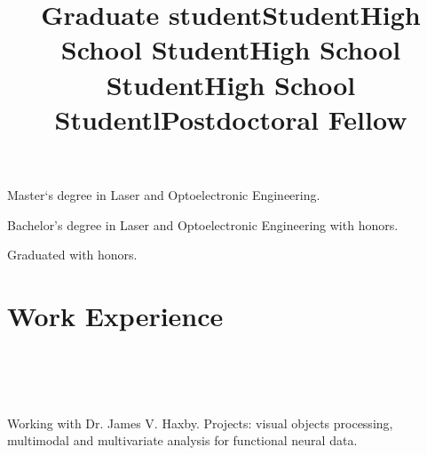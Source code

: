 \documentclass[12pt,overlapped,line]{res}
\begin{document}
\begin{resume}
 \title{Graduate student}
 \begin{position}
  Master`s degree in Laser and Optoelectronic Engineering.
 \end{position}

 \title{Student}
 \begin{position}
  Bachelor's degree in Laser and Optoelectronic Engineering with
  honors.
 \end{position}

 \title{High School Student}
 \begin{position}
  Graduated with honors.
 \end{position}

 \title{High School Student}
 \begin{position}
 \end{position}

 \title{High School Student}
 \begin{position}
 \end{position}

\vspace{-3em}
 \section{Work Experience}
 \begin{format}
   \title{l}\\
   \\
   \body\\
 \end{format}


\title{Postdoctoral Fellow}
\begin{position}
  Working with Dr. James V. Haxby.  Projects: visual objects
  processing, multimodal and multivariate analysis for functional
  neural data.
\end{position}


\end{resume}
\end{document}

